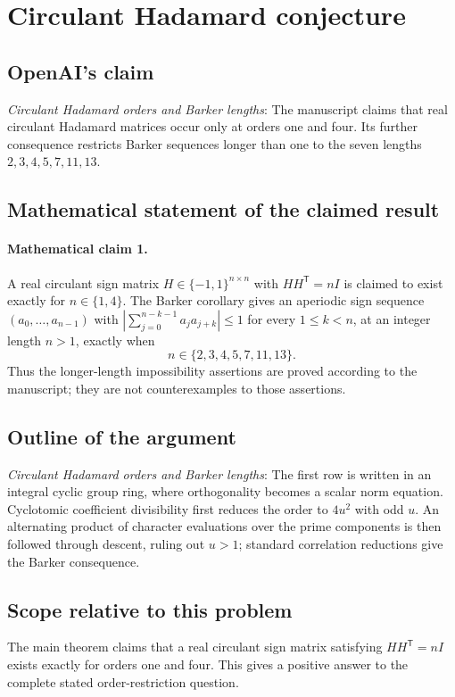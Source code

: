 \documentclass[11pt]{article}
\begin{document}
\section*{Circulant Hadamard conjecture}

\subsection{OpenAI's claim}
\textit{Circulant Hadamard orders and Barker lengths}: The manuscript claims that real circulant Hadamard matrices occur only at orders one and four. Its further consequence restricts Barker sequences longer than one to the seven lengths $2,3,4,5,7,11,13$.

\subsection{Mathematical statement of the claimed result}
\paragraph{Mathematical claim 1.} A real circulant sign matrix $H\in\{-1,1\}^{n\times n}$ with $HH^{\mathsf T}=nI$ is claimed to exist exactly for $n\in\{1,4\}$. The Barker corollary gives an aperiodic sign sequence $(a_0,\ldots,a_{n-1})$ with $|\sum_{j=0}^{n-k-1}a_ja_{j+k}|\le1$ for every $1\le k<n$, at an integer length $n>1$, exactly when \[n\in\{2,3,4,5,7,11,13\}.\] Thus the longer-length impossibility assertions are proved according to the manuscript; they are not counterexamples to those assertions.

\subsection{Outline of the argument}
\textit{Circulant Hadamard orders and Barker lengths}: The first row is written in an integral cyclic group ring, where orthogonality becomes a scalar norm equation. Cyclotomic coefficient divisibility first reduces the order to $4u^2$ with odd $u$. An alternating product of character evaluations over the prime components is then followed through descent, ruling out $u>1$; standard correlation reductions give the Barker consequence.

\subsection{Scope relative to this problem}
The main theorem claims that a real circulant sign matrix satisfying $HH^{\mathsf T}=nI$ exists exactly for orders one and four. This gives a positive answer to the complete stated order-restriction question.
\end{document}
